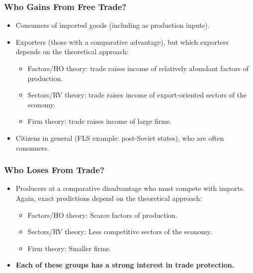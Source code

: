 \documentclass{beamer}
\begin{document}




\begin{frame} 
	\frametitle{\LARGE Who Gains From Free Trade?}
	\begin{itemize}
			\item Consumers of imported goods (including as production inputs). \pause 
			\item Exporters (those with a comparative advantage), but which exporters depends on the theoretical approach: \pause 
			\begin{itemize}
				\item Factors/HO theory: trade raises income of relatively abundant factors of production. \pause 
				\item Sectors/RV theory: trade raises income of export-oriented sectors of the economy. \pause 
				\item Firm theory: trade raises income of large firms. \pause 
			\end{itemize}
			\item Citizens in general (FLS example: post-Soviet states), who are often consumers.
	\end{itemize}
\end{frame}

\begin{frame} 
	\frametitle{\LARGE Who Loses From Trade?}
	\begin{itemize}
			\item Producers at a comparative disadvantage who must compete with imports. Again, exact predictions depend on the theoretical approach: \pause 
			\begin{itemize}
				\item Factors/HO theory: Scarce factors of production. \pause 
				\item Sectors/RV theory: Less competitive sectors of the economy. \pause 
				\item Firm theory: Smaller firms. \pause  
			\end{itemize}
			\item \textbf{Each of these groups has a strong interest in trade protection.}
	\end{itemize}
\end{frame}
\end{document}
